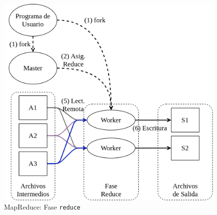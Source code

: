 \begin{figure}[h]
  \centering
  \includegraphics[width=0.75\linewidth]{figuras/MapReduce_reducer_phase.png}
  \caption{MapReduce: Fase {\tt reduce}}
  \label{fig:mapreduce_reducer_phase}
\end{figure}

